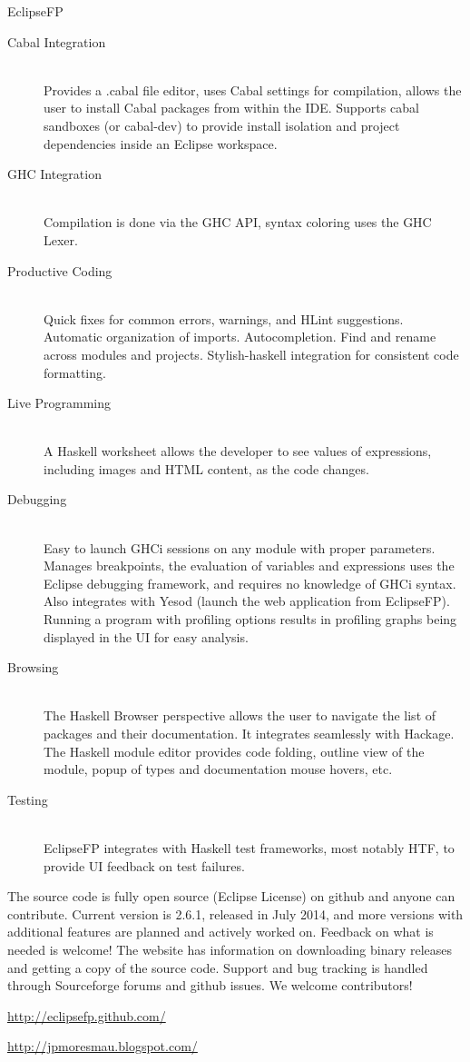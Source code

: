 \begin{hcarentry}[updated]{EclipseFP}
\begin{description}
  \item[Cabal Integration] \hfill \\ Provides a .cabal file editor, uses Cabal
    settings for compilation, allows the user to install Cabal packages from
    within the IDE. Supports cabal sandboxes (or cabal-dev) to provide install isolation and project
    dependencies inside an Eclipse workspace.  \item[GHC Integration] \hfill
    \\ Compilation is done via the GHC API, syntax coloring uses the GHC
  Lexer.  \item[Productive Coding] \hfill \\ Quick fixes for common errors,
    warnings, and HLint suggestions. Automatic organization of imports.
    Autocompletion. Find and rename across modules and projects.
    Stylish-haskell integration for consistent code formatting.
  \item[Live Programming] \hfill \\ A Haskell worksheet allows the developer to see
    values of expressions, including images and HTML content, as the code changes.
  \item[Debugging] \hfill \\ Easy to launch GHCi sessions on any module with
    proper parameters. Manages breakpoints, the evaluation of variables and
    expressions uses the Eclipse debugging framework, and requires no
    knowledge of GHCi syntax. Also integrates with Yesod (launch the web
    application from EclipseFP). Running a program with profiling options
    results in profiling graphs being displayed in the UI for easy analysis.
  \item[Browsing] \hfill \\ The Haskell Browser perspective allows the user to
    navigate the list of packages and their documentation. It integrates
    seamlessly with Hackage. The Haskell module editor provides code folding,
    outline view of the module, popup of types and documentation mouse hovers,
    etc.  \item[Testing] \hfill \\ EclipseFP integrates with Haskell test
      frameworks, most notably HTF, to provide UI feedback on test failures.
\end{description}

The source code is fully open source (Eclipse License) on github and anyone
can contribute. Current version is 2.6.1, released in July 2014, and more
versions with additional features are planned and actively worked on. Feedback
on what is needed is welcome! The website has information on downloading
binary releases and getting a copy of the source code. Support and bug
tracking is handled through Sourceforge forums and github issues. We welcome
contributors!

\FurtherReading
\begin{compactitem}
\item \url{http://eclipsefp.github.com/}
\item \url{http://jpmoresmau.blogspot.com/}
\end{compactitem}
\end{hcarentry}
